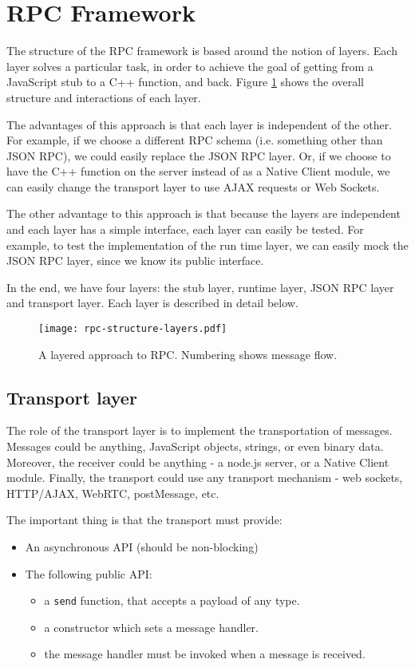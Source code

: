 \section{RPC Framework} %
\label{sec:rpc_framework_structure}

The structure of the RPC framework is based around the notion of layers. 
Each layer solves a particular task, in order to achieve the goal of getting from a JavaScript stub to a C++ function, and back. Figure \ref{fig:structurediagram} shows the overall structure and interactions of each layer.

The advantages of this approach is that each layer is independent of the other. For example, if we choose a different RPC schema (i.e. something other than JSON RPC), we could easily replace the JSON RPC layer. Or, if we choose to have the C++ function on the server instead of as a Native Client module, we can easily change the transport layer to use AJAX requests or Web Sockets. 


The other advantage to this approach is that because the layers are independent and each layer has a simple interface, each layer can easily be tested. For example, to test the implementation of the run time layer, we can easily mock the JSON RPC layer, since we know its public interface.

In the end, we have four layers: the stub layer, runtime layer, JSON RPC layer and transport layer. Each layer is described in detail below.

\begin{figure}
    \centering
    \texttt{[image: rpc-structure-layers.pdf]} 
    \caption{A layered approach to RPC. Numbering shows message flow.}
    \label{fig:structurediagram}
\end{figure}


\subsection{Transport layer} %
\label{sub:transport_layer_design}
The role of the transport layer is to implement the transportation of messages. Messages could be anything, JavaScript objects, strings, or even binary data. Moreover, the receiver could be anything - a node.js server, or a Native Client module. Finally, the transport could use any transport mechanism - web sockets, HTTP/AJAX, WebRTC, postMessage, etc.

The important thing is that the transport must provide:
\begin{itemize}
	\item An asynchronous API (should be non-blocking)
	\item The following public API:
	\begin{itemize}
		\item a \lstinline+send+ function, that accepts a payload of any type.
		\item a constructor which sets a message handler.
		\item the message handler must be invoked when a message is received. 
	\end{itemize}
\end{itemize}

